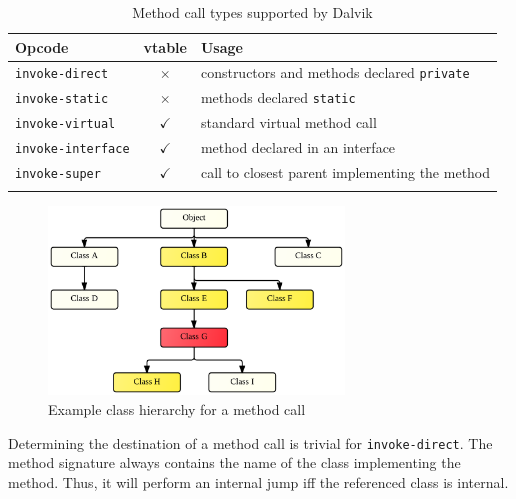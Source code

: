 \documentclass[12pt,twoside,notitlepage]{report}
\newcommand{\tick}{$\checkmark$}
\newcommand{\cross}{$\times$}
\begin{document}
\begin{table}[h]
	\begin{center}
	\begin{footnotesize}
	\begin{tabular}{|l|c|l|}
		\firsthline
		\textbf{Opcode}         & \footnotesize{\textbf{vtable}} & \textbf{Usage} \\
		\hline
		\verb$invoke-direct$    & \cross          & constructors and methods declared \verb$private$ \\
		\verb$invoke-static$    & \cross          & methods declared \verb$static$ \\
		\hline
		\verb$invoke-virtual$   & \tick           & standard virtual method call \\
		\verb$invoke-interface$ & \tick           & method declared in an interface \\
		\verb$invoke-super$     & \tick           & call to closest parent implementing the method \\
		\lasthline
	\end{tabular}
	\end{footnotesize}
	\end{center}
	\caption{Method call types supported by Dalvik}
	\label{table:TaintPropagation_MethodCallTypes}
\end{table}

\begin{figure}[h]
	\centerline{	
		\includegraphics[width=0.7\textwidth]{figs/fig_virtual_call_tree.png}
	}
	\caption{Example class hierarchy for a method call}
	\label{fig:TaintPropagation_DestDecision_ClassHierarchy}
\end{figure}

Determining the destination of a method call is trivial for \verb$invoke-direct$. The method signature always contains the name of the class implementing the method. Thus, it will perform an internal jump iff the referenced class is internal.
\end{document}
